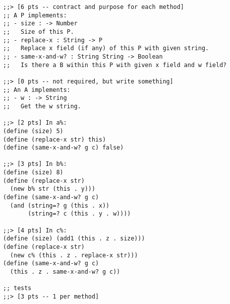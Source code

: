 \documentclass[12pt]{article}                   %
\newenvironment{solution}{}{}
\begin{document}
\begin{problem}
\newpage
\ifrubric{}
\newpage
\fi

\begin{solution}
\begin{verbatim}
;;> [6 pts -- contract and purpose for each method]
;; A P implements:
;; - size : -> Number
;;   Size of this P.
;; - replace-x : String -> P
;;   Replace x field (if any) of this P with given string.
;; - same-x-and-w? : String String -> Boolean
;;   Is there a B within this P with given x field and w field?

;;> [0 pts -- not required, but write something]
;; An A implements:
;; - w : -> String
;;   Get the w string.

;;> [2 pts] In a%: 
(define (size) 5)
(define (replace-x str) this)
(define (same-x-and-w? g c) false)

;;> [3 pts] In b%:
(define (size) 8)
(define (replace-x str)
  (new b% str (this . y)))
(define (same-x-and-w? g c)
  (and (string=? g (this . x))
       (string=? c (this . y . w))))

;;> [4 pts] In c%:
(define (size) (add1 (this . z . size)))
(define (replace-x str)
  (new c% (this . z . replace-x str)))
(define (same-x-and-w? g c)
  (this . z . same-x-and-w? g c))

;; tests
;;> [3 pts -- 1 per method]

\end{verbatim}
\end{solution}
\end{problem}
\newpage
\end{document}
